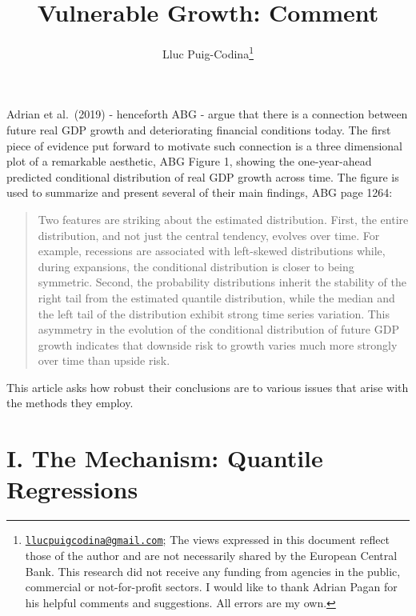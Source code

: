 \documentclass[12pt,]{article}
\title{Vulnerable Growth: Comment}
\author{Lluc Puig-Codina\footnote{\href{mailto:llucpuigcodina@gmail.com}{\nolinkurl{llucpuigcodina@gmail.com}};
  The views expressed in this document reflect those of the author and
  are not necessarily shared by the European Central Bank. This research
  did not receive any funding from agencies in the public, commercial or
  not-for-profit sectors. I would like to thank Adrian Pagan for his
  helpful comments and suggestions. All errors are my own.}}
\date{}
\begin{document}
\maketitle

\newpage


\vspace{0.5cm}

Adrian et al.~(2019) - henceforth ABG - argue that there is a connection
between future real GDP growth and deteriorating financial conditions
today. The first piece of evidence put forward to motivate such
connection is a three dimensional plot of a remarkable aesthetic, ABG
Figure 1, showing the one-year-ahead predicted conditional distribution
of real GDP growth across time. The figure is used to summarize and
present several of their main findings, ABG page 1264:

\begin{quote}
Two features are striking about the estimated distribution. First, the
entire distribution, and not just the central tendency, evolves over
time. For example, recessions are associated with left-skewed
distributions while, during expansions, the conditional distribution is
closer to being symmetric. Second, the probability distributions inherit
the stability of the right tail from the estimated quantile
distribution, while the median and the left tail of the distribution
exhibit strong time series variation. This asymmetry in the evolution of
the conditional distribution of future GDP growth indicates that
downside risk to growth varies much more strongly over time than upside
risk.
\end{quote}

This article asks how robust their conclusions are to various issues
that arise with the methods they employ.

\hypertarget{i.-the-mechanism-quantile-regressions}{%
\section{I. The Mechanism: Quantile
Regressions}\label{i.-the-mechanism-quantile-regressions}}
\end{document}

